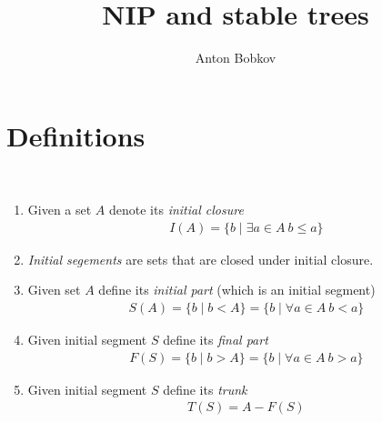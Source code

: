 \documentclass{amsart}
\begin{document}
\title{NIP and stable trees}
\author{Anton Bobkov}

\maketitle

\section{Definitions}

\begin{Definition}\ 
	\begin{enumerate}
		\item Given a set $A$ denote its \emph{initial closure} 
		\begin{align*}
			I(A) = \{b \mid \exists a \in A \ b \leq a\}
		\end{align*}
		\item \emph{Initial segements} are sets that are closed under initial closure.
		\item Given set $A$ define its \emph{initial part} (which is an initial segment)
		\begin{align*}
			S(A) = \{b \mid b < A\} = \{b \mid \forall a \in A \ b < a\}
		\end{align*}
		\item Given initial segment $S$ define its \emph{final part}
		\begin{align*}
			F(S) = \{b \mid b > A\} = \{b \mid \forall a \in A \ b > a\}
		\end{align*}
		\item Given initial segment $S$ define its \emph{trunk}
		\begin{align*}
			T(S) = A - F(S)
		\end{align*}
	\end{enumerate}
\end{Definition}
\end{document}
